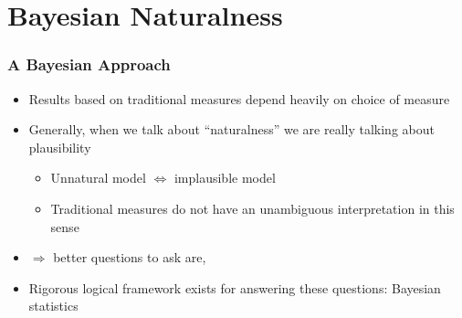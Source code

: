 \documentclass[10pt,aspectratio=169]{beamer}
\begin{document}
\section{Bayesian Naturalness}

\begin{frame}
  \frametitle{A Bayesian Approach}
  \begin{itemize} \itemsep1.1em
  \item Results based on traditional measures depend heavily on
    choice of measure
  \item Generally, when we talk about ``naturalness'' we are really
    talking about plausibility
    \begin{itemize} \itemsep0.8em
    \item Unnatural model $\Leftrightarrow$ implausible model
    \item \alert{Traditional measures do not have an unambiguous interpretation
      in this sense}
    \end{itemize}
  \item $\Rightarrow$ better questions to ask are,
    \vspace{7pt}
    \begin{center}
    \end{center}
  \item {\color{blue} Rigorous logical framework exists for answering these
    questions: Bayesian statistics}
  \end{itemize}
\end{frame}
\end{document}
